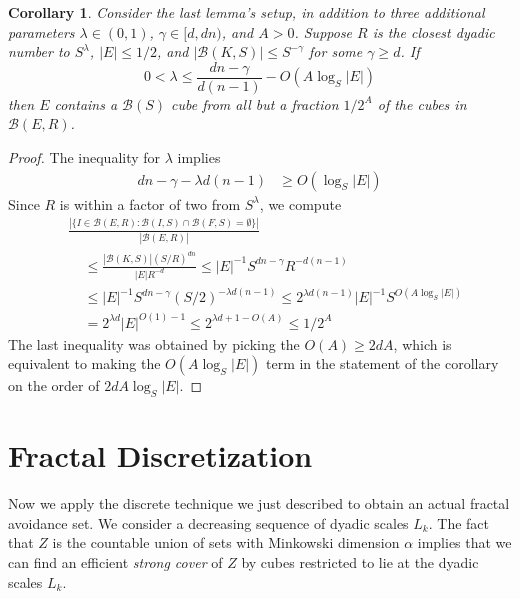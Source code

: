 \documentclass{article}
\theoremstyle{plain}
\newtheorem{corollary}{Corollary}
\theoremstyle{plain}
\begin{document}
\begin{corollary}
	Consider the last lemma's setup, in addition to three additional parameters $\lambda \in (0,1)$, $\gamma \in [d,dn)$, and $A > 0$. Suppose $R$ is the closest dyadic number to $S^\lambda$, $|E| \leq 1/2$, and $|\mathcal{B}(K,S)| \leq S^{-\gamma}$ for some $\gamma \geq d$. If
	\[ 0 < \lambda \leq \frac{dn - \gamma}{d(n-1)} - O \left( A \log_S |E| \right) \]
	then $E$ contains a $\mathcal{B}(S)$ cube from all but a fraction $1/2^A$ of the cubes in $\mathcal{B}(E,R)$.
\end{corollary}
\begin{proof}
	The inequality for $\lambda$ implies
	\begin{align*}
		dn - \gamma - \lambda d(n-1) &\geq O \left( \log_S |E| \right)%
	\end{align*}
	Since $R$ is within a factor of two from $S^\lambda$, we compute
	\begin{align*}
		&\frac{|\{ I \in \mathcal{B}(E,R): \mathcal{B}(I,S) \cap \mathcal{B}(F,S) = \emptyset \}|}{|\mathcal{B}(E,R)|}\\
		&\ \ \ \ \ \leq \frac{|\mathcal{B}(K,S)| (S/R)^{dn}}{|E|R^{-d}} \leq |E|^{-1} S^{dn - \gamma} R^{-d(n-1)}\\
		&\ \ \ \ \ \leq |E|^{-1} S^{dn - \gamma} (S/2)^{- \lambda d(n-1)} \leq 2^{\lambda d (n-1)}|E|^{-1} S^{O(A \log_S|E|)}\\
		&\ \ \ \ \ = 2^{\lambda d} |E|^{O(1) - 1} \leq 2^{\lambda d + 1 - O(A)} \leq 1/2^A
	\end{align*}
	The last inequality was obtained by picking the $O(A) \geq 2d A$, which is equivalent to making the $O(A \log_S |E|)$ term in the statement of the corollary on the order of $2d A \log_S |E|$.
\end{proof}

\section{Fractal Discretization}

Now we apply the discrete technique we just described to obtain an actual fractal avoidance set. We consider a decreasing sequence of dyadic scales $L_k$. The fact that $Z$ is the countable union of sets with Minkowski dimension $\alpha$ implies that we can find an efficient {\it strong cover} of $Z$ by cubes restricted to lie at the dyadic scales $L_k$.
\end{document}
